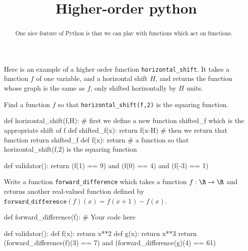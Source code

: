 \documentclass{ximera}
\title{Higher-order python}
\begin{document}
\begin{abstract}
  One nice feature of Python is that we can play with functions which act on functions.
\end{abstract}

\begin{question}
  Here is an example of a higher order function
  \verb|horizontal_shift|.  It takes a function $f$ of one variable,
  and a horizontal shift $H$, and returns the function whose graph is
  the same as $f$, only shifted horizontally by $H$ units.


  \begin{solution}
    Find a function $f$ so that \verb|horizontal_shift(f,2)| is the squaring function.
  
    \begin{python}
def horizontal_shift(f,H):
  # first we define a new function shifted_f which is the appropriate shift of f
  def shifted_f(x):  
    return f(x-H)
  # then we return that function
  return shifted_f
def f(x):
  return # a function so that horizontal_shift(f,2) is the squaring function

def validator():
  return (f(1) == 9) and (f(0) == 4) and (f(-3) == 1)
    \end{python}
  \end{solution}


  \begin{solution}
    Write a function \verb|forward_difference| which takes a function $f : \R \to \R$ and returns another real-valued function defined 
    by $\texttt{forward\_difference}(f)(x) = f(x+1)-f(x)$.

    \begin{python}
def forward_difference(f):
  # Your code here

def validator():
  def f(x):
    return x**2
  def g(x):
    return x**3
  return (forward_difference(f)(3) == 7) and (forward_difference(g)(4) == 61)
    \end{python}
  \end{solution}
\end{question}
\end{document}
